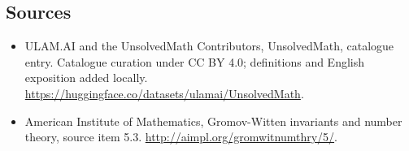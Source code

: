 \documentclass[11pt]{article}
\begin{document}
\subsection{Sources}
\begin{itemize}
\item[\hypertarget{source:statement:1}{S1}] ULAM.AI and the UnsolvedMath Contributors, UnsolvedMath, catalogue entry. Catalogue curation under CC BY 4.0; definitions and English exposition added locally.
\url{https://huggingface.co/datasets/ulamai/UnsolvedMath}.
\item[\hypertarget{source:statement:2}{S2}] American Institute of Mathematics, Gromov-Witten invariants and number theory, source item 5.3.
\url{http://aimpl.org/gromwitnumthry/5/}.
\end{itemize}
\label{end:statement}
\end{document}
